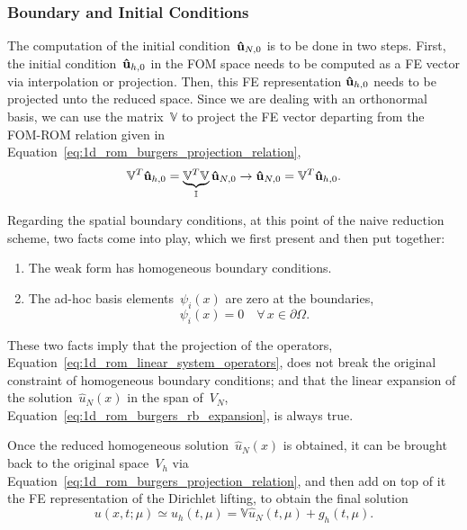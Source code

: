 \documentclass[../../thesis.tex]{subfiles}
\newcommand{\rbV}{\ensuremath{\mathbb{V}}}
\newcommand{\rbVT}{\ensuremath{\rbV^T}}
\begin{document}
\subsubsection{Boundary and Initial Conditions}
The computation of the initial condition~$\vb{\hat{u}}_{N,0}$ is to be done in two steps. 
First, the initial condition~$\vb{\hat{u}}_{h,0}$ in the FOM space needs to be computed as a FE vector via interpolation or projection.
Then, this FE representation $\vb{\hat{u}}_{h,0}$ needs to be projected unto the reduced space. 
Since we are dealing with an orthonormal basis, we can use the matrix~$\rbV$ to project the FE vector departing from the \mbox{FOM-ROM} relation given in Equation~\eqref{eq:1d_rom_burgers_projection_relation},
\begin{equation}
    \rbVT \vb{\hat{u}}_{h,0} = \underbrace{\rbVT \rbV}_{\mathbb{I}} \vb{\hat{u}}_{N,0} 
    \rightarrow 
    \vb{\hat{u}}_{N,0} = \rbVT \vb{\hat{u}}_{h,0}.
\end{equation}

Regarding the spatial boundary conditions, at this point of the naive reduction scheme, two facts come into play, which we first present and then put together:
\begin{enumerate}
    \item The weak form has homogeneous boundary conditions.
    \item The ad-hoc basis elements~$\psi_i(x)$ are zero at the boundaries,
    \begin{equation*}
        \psi_i(x) = 0 \quad \forall \, x \in \partial \Omega.
    \end{equation*}
\end{enumerate}
These two facts imply that the projection of the operators, 
Equation~\eqref{eq:1d_rom_linear_system_operators}, 
does not break the original constraint of homogeneous boundary conditions;
and that the linear expansion of the solution~$\hat{u}_N(x)$ in the span of~$V_N$, 
Equation~\eqref{eq:1d_rom_burgers_rb_expansion}, 
is always true.

Once the reduced homogeneous solution~$\hat{u}_N(x)$ is obtained, 
it can be brought back to the original space~$V_h$ via 
Equation~\eqref{eq:1d_rom_burgers_projection_relation}, 
and then add on top of it the FE representation of the Dirichlet lifting, to obtain the final solution
\begin{equation}
    u(x, t; \mu) \simeq u_h(t, \mu) = \rbV \hat{u}_N(t, \mu) + g_h(t,\mu).
\end{equation}
\end{document}
